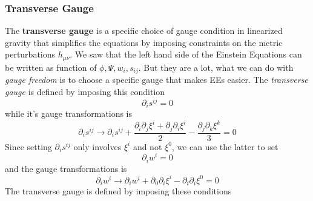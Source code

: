 \subsubsection{Transverse Gauge}

The \textbf{transverse gauge} is a specific choice of gauge condition in linearized gravity that simplifies the equations by imposing constraints on the metric perturbations $h_{\mu \nu }$. 
We saw that the left hand side of the Einstein Equations can be written as function of $\phi ,\Psi ,w_{i},s_{ij}$. But they are a lot, what we can do with \emph{gauge freedom} is to choose a specific gauge that makes EEs easier. The \emph{transverse gauge }is defined by imposing this condition
\[
\partial_{i}s^{ij} = 0	
\]
while it's gauge transformations is 
\[
\partial_{i} s^{ij} \to \partial_{i}s^{ij} + \frac{\partial_{i}\partial_{j}\xi ^{i}+\partial_{j}\partial_{i}\xi ^{i}}{2} - \frac{\partial_{j}\partial_{k}\xi ^{k}}{3} = 0
\]
Since setting $\partial_{i}s^{ij}$ only involves $\xi ^{i}$ and not $\xi ^{0}$, we can use the latter to set
\[
\partial_{i}w^{i} = 0 
\]
and the gauge transformations is
\[
\partial_{i}w^{i} \to \partial_{i}w^{i}+ \partial_{0}\partial_{i}\xi ^{i} - \partial_{i}\partial_{i}\xi ^{0} = 0
\]
The transverse gauge is defined by imposing these conditions

